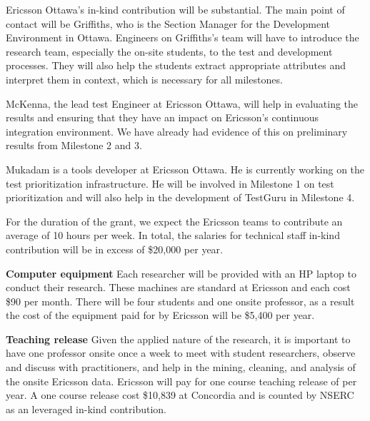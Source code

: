 \documentclass[12pt, letterpaper]{article}
\begin{document}
\fancyhead{}
\pagestyle{fancy}
\renewcommand{\headrulewidth}{0pt}

\begin{center}
\begin{LARGE}
\noindent
{}
\end{LARGE}
\end{center}


Ericsson Ottawa's in-kind contribution will be substantial. The main point of
contact will be Griffiths, who is the Section Manager for the Development
Environment in Ottawa. Engineers on Griffiths's team will have to introduce the
research team, especially the on-site students, to the test and development
processes. They will also help the students extract appropriate attributes and
interpret them in context, which is necessary for all milestones.

McKenna, the lead test Engineer at Ericsson Ottawa, will help in evaluating the
results and ensuring that they have an impact on Ericsson's continuous
integration environment. We have already had evidence of this on preliminary results from Milestone 2 and 3. 

Mukadam is a tools developer at Ericsson Ottawa. He is currently working on the test prioritization infrastructure. He will be involved in Milestone 1 on test prioritization and will also help in the development of TestGuru in Milestone 4.

For the duration of the grant, we expect the Ericsson teams to contribute an
average of 10 hours per week. In total, the salaries for technical staff in-kind contribution will be in excess of \$20,000 per year.

\textbf{Computer equipment}
Each researcher will be provided with an HP laptop to conduct their research. These machines are standard at Ericsson and each cost \$90 per month. There will be four students and one onsite professor, as a result the cost of the equipment paid for by Ericsson will be \$5,400 per year.

\textbf{Teaching release}
Given the applied nature of the research, it is important to have one professor onsite once a week to meet with student researchers, observe and discuss with practitioners, and help in the mining, cleaning, and analysis of the onsite Ericsson data. Ericsson will pay for one course teaching release of per year. A one course release cost \$10,839 at Concordia and is counted by NSERC as an leveraged in-kind contribution. 
\end{document}
